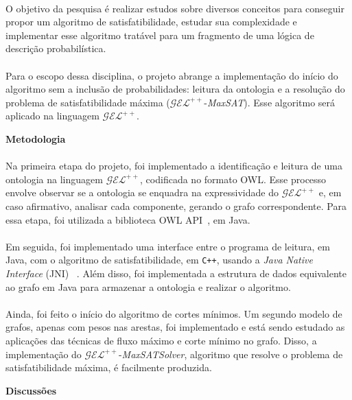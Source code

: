 \documentclass[portrait]{ppgcaposter}
\newcommand{\gelpp}{\mathcal{GEL}^{++}}
\begin{document}
\begin{multicols}{2}
    \paragraph{}
    O objetivo da pesquisa é realizar estudos sobre diversos conceitos para conseguir propor um algoritmo de satisfatibilidade, estudar sua complexidade e implementar esse algoritmo tratável para um fragmento de uma lógica de descrição probabilística.
    \paragraph{}
    Para o escopo dessa disciplina, o projeto abrange a implementação do início do algoritmo sem a inclusão de probabilidades: leitura da ontologia e a resolução do problema de satisfatibilidade máxima ($\gelpp$-\emph{MaxSAT}). Esse algoritmo será aplicado na linguagem $\gelpp$.
    \\
    \begin{mdframed}[style=MyFrame]
        \begin{center}
            \huge  \textbf{Metodologia}
        \end{center}
    \end{mdframed}
    \paragraph{}
    Na primeira etapa do projeto, foi implementado a identificação e leitura de uma ontologia na linguagem $\gelpp$, codificada no formato OWL. Esse processo envolve observar se a ontologia se enquadra na expressividade do $\gelpp$ e, em caso afirmativo, analisar cada componente, gerando o grafo correspondente. Para essa etapa, foi utilizada a biblioteca OWL API~\cite{OWLAPI}, em Java.
    \paragraph{}
    Em seguida, foi implementado uma interface entre o programa de leitura, em Java, com o algoritmo de satisfatibilidade, em \texttt{C++}, usando a \emph{Java Native Interface} (JNI) ~\cite{JNI}.
    Além disso, foi implementada a estrutura de dados equivalente ao grafo em Java para armazenar a ontologia e realizar o algoritmo.
    \paragraph{}
    Ainda, foi feito o início do algoritmo de cortes mínimos. Um segundo modelo de grafos, apenas com pesos nas arestas, foi implementado e está sendo estudado as aplicações das técnicas de fluxo máximo e corte mínimo no grafo. Disso, a implementação do $\gelpp$-\emph{MaxSATSolver}, algoritmo que resolve o problema de satisfatibilidade máxima, é facilmente produzida.
    \columnbreak
    \begin{mdframed}[style=MyFrame]
        \begin{center}
            \huge  \textbf{Discussões\vphantom{ç}}
        \end{center}
    \end{mdframed}


\end{multicols}
\end{document}
